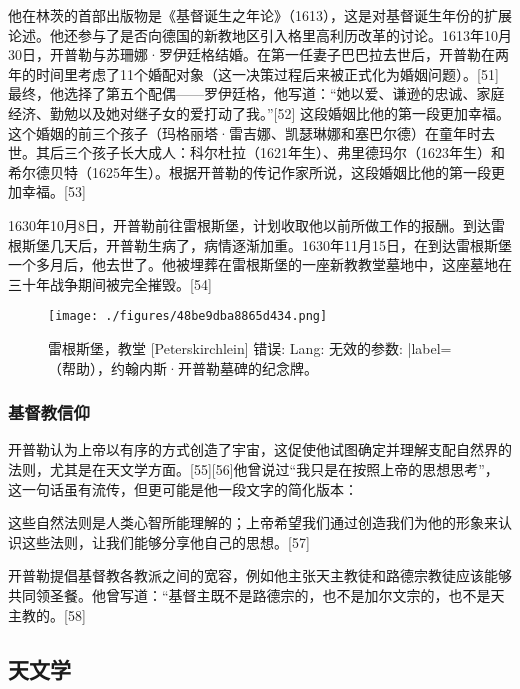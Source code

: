 他在林茨的首部出版物是《基督诞生之年论》（1613），这是对基督诞生年份的扩展论述。他还参与了是否向德国的新教地区引入格里高利历改革的讨论。1613年10月30日，开普勒与苏珊娜·罗伊廷格结婚。在第一任妻子巴巴拉去世后，开普勒在两年的时间里考虑了11个婚配对象（这一决策过程后来被正式化为婚姻问题）。[51]最终，他选择了第五个配偶——罗伊廷格，他写道：“她以爱、谦逊的忠诚、家庭经济、勤勉以及她对继子女的爱打动了我。”[52] 这段婚姻比他的第一段更加幸福。这个婚姻的前三个孩子（玛格丽塔·雷吉娜、凯瑟琳娜和塞巴尔德）在童年时去世。其后三个孩子长大成人：科尔杜拉（1621年生）、弗里德玛尔（1623年生）和希尔德贝特（1625年生）。根据开普勒的传记作家所说，这段婚姻比他的第一段更加幸福。[53]

1630年10月8日，开普勒前往雷根斯堡，计划收取他以前所做工作的报酬。到达雷根斯堡几天后，开普勒生病了，病情逐渐加重。1630年11月15日，在到达雷根斯堡一个多月后，他去世了。他被埋葬在雷根斯堡的一座新教教堂墓地中，这座墓地在三十年战争期间被完全摧毁。[54]
\begin{figure}[ht]
\centering
\texttt{[image: ./figures/48be9dba8865d434.png]}
\caption{雷根斯堡，教堂 [Peterskirchlein] 错误: {{Lang}}: 无效的参数: |label=（帮助），约翰内斯·开普勒墓碑的纪念牌。} \label{fig_KPL1_10}
\end{figure}
\subsubsection{基督教信仰}  
开普勒认为上帝以有序的方式创造了宇宙，这促使他试图确定并理解支配自然界的法则，尤其是在天文学方面。[55][56]他曾说过“我只是在按照上帝的思想思考”，这一句话虽有流传，但更可能是他一段文字的简化版本：

这些自然法则是人类心智所能理解的；上帝希望我们通过创造我们为他的形象来认识这些法则，让我们能够分享他自己的思想。[57]

开普勒提倡基督教各教派之间的宽容，例如他主张天主教徒和路德宗教徒应该能够共同领圣餐。他曾写道：“基督主既不是路德宗的，也不是加尔文宗的，也不是天主教的。[58]
\subsection{天文学}  
